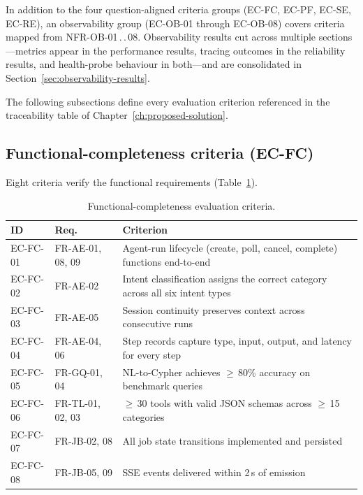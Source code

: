 \documentclass[a4paper]{sapthesis}
\begin{document}
In addition to the four question-aligned criteria groups
(EC-FC, EC-PF, EC-SE, EC-RE), an observability group
(EC-OB-01 through EC-OB-08) covers criteria mapped from
NFR-OB-01\,.\,.\,08.  Observability results cut across multiple
sections---metrics appear in the performance results, tracing outcomes in
the reliability results, and health-probe behaviour in both---and are
consolidated in Section~\ref{sec:observability-results}.

The following subsections define every evaluation criterion referenced
in the traceability table of Chapter~\ref{ch:proposed-solution}.

\subsection{Functional-completeness criteria (EC-FC)}

Eight criteria verify the functional requirements
(Table~\ref{tab:ec-fc}).

\begin{table}[ht]
\centering
\caption{Functional-completeness evaluation criteria.}
\label{tab:ec-fc}
\small
\begin{tabularx}{\textwidth}{@{}l l X@{}}
    \hline
    \textbf{ID} & \textbf{Req.} & \textbf{Criterion} \\
    \hline
    EC-FC-01 & FR-AE-01, 08, 09 & Agent-run lifecycle (create, poll,
        cancel, complete) functions end-to-end \\
    EC-FC-02 & FR-AE-02 & Intent classification assigns the correct
        category across all six intent types \\
    EC-FC-03 & FR-AE-05 & Session continuity preserves context across
        consecutive runs \\
    EC-FC-04 & FR-AE-04, 06 & Step records capture type, input, output,
        and latency for every step \\
    EC-FC-05 & FR-GQ-01, 04 & NL-to-Cypher achieves $\geq$\,80\%
        accuracy on benchmark queries \\
    EC-FC-06 & FR-TL-01, 02, 03 & $\geq$\,30 tools with valid JSON
        schemas across $\geq$\,15 categories \\
    EC-FC-07 & FR-JB-02, 08 & All job state transitions implemented
        and persisted \\
    EC-FC-08 & FR-JB-05, 09 & SSE events delivered within 2\,s of
        emission \\
    \hline
\end{tabularx}
\end{table}
\end{document}
